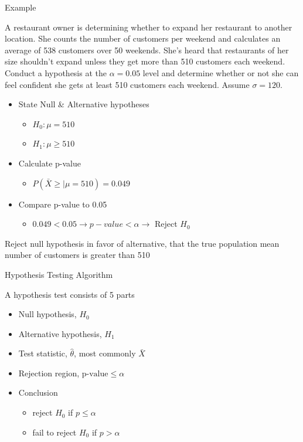 \documentclass{beamer}
\begin{document}
\begin{frame}{Example}
	\footnotesize{A restaurant owner is determining whether to expand her restaurant to another location. She counts the number of customers per weekend and calculates an average of 538 customers over 50 weekends. She's heard that restaurants of her size shouldn't expand unless they get more than 510 customers each weekend. Conduct a hypothesis at the $\alpha=0.05$ level and determine whether or not she can feel confident she gets at least 510 customers each weekend. Assume $\sigma= 120$.
		\begin{itemize}
			\item State Null \& Alternative hypotheses
			      \begin{itemize}
			      	\item $H_0: \mu=510$
			      	\item $H_1: \mu \geq 510$
			      \end{itemize}
			\item Calculate p-value
			      \begin{itemize}
			      	\item $P(\bar{X} \geq | \mu=510)=0.049$
			      \end{itemize}
			\item Compare p-value to 0.05
			      \begin{itemize}
			      	\item $0.049 < 0.05 \rightarrow p-value<\alpha \rightarrow$ Reject $H_0$
			      \end{itemize}
		\end{itemize}
	Reject null hypothesis in favor of alternative, that the true population mean number of customers is greater than 510}
\end{frame}

\begin{frame}{Hypothesis Testing Algorithm}
	
	A hypothesis test consists of 5 parts
	
	\begin{itemize}
		\item Null hypothesis, $H_0$
		\item Alternative hypothesis, $H_1$
		\item Test statistic, $\hat{\theta}$, most commonly $\bar{X}$
		\item Rejection region, $\text{p-value}\leq \alpha$
		\item Conclusion
		      \begin{itemize}
		      	\item reject $H_0$ if $p \leq \alpha$
		      	\item fail to reject $H_0$ if $p > \alpha$
		      \end{itemize}
	\end{itemize}
	
\end{frame}
\end{document}
